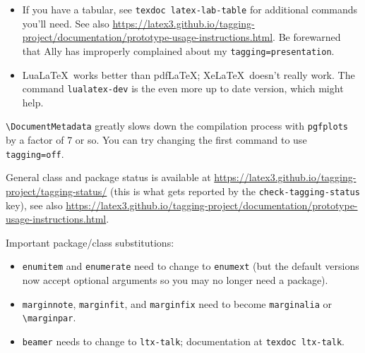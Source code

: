 \documentclass{article}
\begin{document}
\begin{itemize}
``Best practices'' recommend that alt text has at most two sentences or 120 characters, and to keep in mind that alt text is generally invisible to most users (also don't start with ``image'', since screen readers often provide the word ``image'' on their own).  If you need significantly more than that limit, you're supposed to use the alt text to point to the longer description.
\item If you have a tabular, see \texttt{texdoc latex-lab-table} for additional commands you'll need.  See also \url{https://latex3.github.io/tagging-project/documentation/prototype-usage-instructions.html}.  Be forewarned that Ally has improperly complained about my \texttt{tagging=presentation}.
\item Lua\LaTeX\ works better than pdf\LaTeX; Xe\LaTeX\ doesn't really work.  The command \texttt{lualatex-dev} is the even more up to date version, which might help.
\end{itemize}

\noindent
\verb|\DocumentMetadata| greatly slows down the compilation process with \texttt{pgfplots} by a factor of 7 or so.
You can try changing the first command to use \texttt{tagging=off}.

General class and package status is available at \url{https://latex3.github.io/tagging-project/tagging-status/} (this is what gets reported by the \texttt{check-tagging-status} key), see also \url{https://latex3.github.io/tagging-project/documentation/prototype-usage-instructions.html}.

Important package/class substitutions:
\begin{itemize}
\item \texttt{enumitem} and \texttt{enumerate} need to change to \texttt{enumext} (but the default versions now accept optional arguments so you may no longer need a package).
\item \texttt{marginnote}, \texttt{marginfit}, and \texttt{marginfix} need to become \texttt{marginalia} or \verb|\marginpar|.
\item \texttt{beamer} needs to change to \texttt{ltx-talk}; documentation at \texttt{texdoc ltx-talk}.
\end{itemize}
\end{document}
